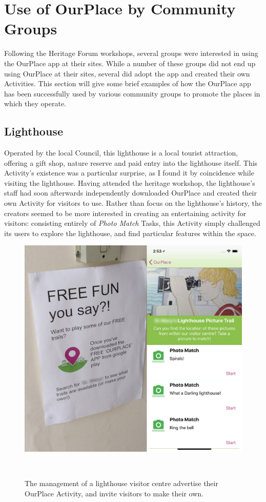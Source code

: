 \section{Use of OurPlace by Community Groups}

Following the Heritage Forum workshops, several groups were interested in using the OurPlace app at their sites. While a number of these groups did not end up using OurPlace at their sites, several did adopt the app and created their own Activities. This section will give some brief examples of how the OurPlace app has been successfully used by various community groups to promote the places in which they operate.

\subsection{Lighthouse}

Operated by the local Council, this lighthouse is a local tourist attraction, offering a gift shop, nature reserve and paid entry into the lighthouse itself. This Activity's existence was a particular surprise, as I found it by coincidence while visiting the lighthouse. Having attended the heritage workshop, the lighthouse's staff had soon afterwards independently downloaded OurPlace and created their own Activity for visitors to use. Rather than focus on the lighthouse's history, the creators seemed to be more interested in creating an entertaining activity for visitors: consisting entirely of \textit{Photo Match} Tasks, this Activity simply challenged its users to explore the lighthouse, and find particular features within the space.

\begin{figure}
  \centering
  \includegraphics[width=0.65\columnwidth]{images/chapter06/OurPlaceLighthouse.jpg}
  \caption[An OurPlace Activity at a lighthouse]{The management of a lighthouse visitor centre advertise their OurPlace Activity, and invite visitors to make their own.}~\label{fig:OurPlaceLighthouse}
\end{figure}

